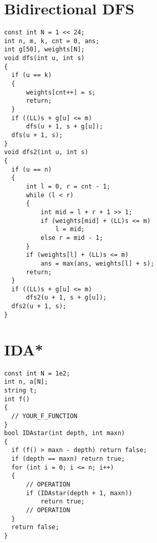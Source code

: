 \section{Bidirectional DFS}
\begin{lstlisting}
const int N = 1 << 24;
int n, m, k, cnt = 0, ans;
int g[50], weights[N];
void dfs(int u, int s)
{
  if (u == k)
  {
      weights[cnt++] = s;
      return;
  }
  if ((LL)s + g[u] <= m)
      dfs(u + 1, s + g[u]);
  dfs(u + 1, s);
}
void dfs2(int u, int s)
{
  if (u == n)
  {
      int l = 0, r = cnt - 1;
      while (l < r)
      {
          int mid = l + r + 1 >> 1;
          if (weights[mid] + (LL)s <= m)
              l = mid;
          else r = mid - 1;
      }
      if (weights[l] + (LL)s <= m)
          ans = max(ans, weights[l] + s);
      return;
  }
  if ((LL)s + g[u] <= m)
      dfs2(u + 1, s + g[u]);
  dfs2(u + 1, s);
}
\end{lstlisting}
\section{IDA*}
\begin{lstlisting}
const int N = 1e2;
int n, a[N];
string t;
int f()
{
  // YOUR_F_FUNCTION
}
bool IDAstar(int depth, int maxn)
{
  if (f() > maxn - depth) return false;
  if (depth == maxn) return true;
  for (int i = 0; i <= n; i++)
  {
      // OPERATION
      if (IDAstar(depth + 1, maxn))
          return true;
      // OPERATION
  }
  return false;
}
\end{lstlisting}
